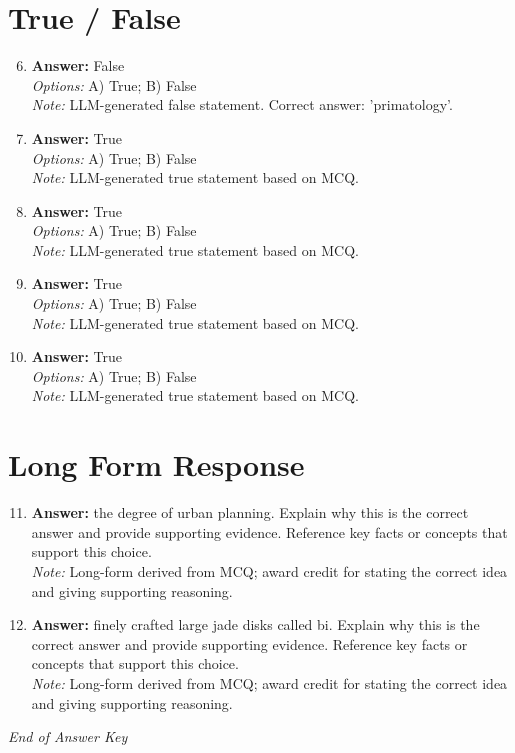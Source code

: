 \documentclass[12pt]{article}
\begin{document}
\section*{True / False}
\begin{enumerate}[label=\arabic*.]
\setcounter{enumi}{5}
\item \textbf{Answer:} False
\\ \textit{Options:} A) True; B) False
\\ \textit{Note:} LLM-generated false statement. Correct answer: 'primatology'.
\item \textbf{Answer:} True
\\ \textit{Options:} A) True; B) False
\\ \textit{Note:} LLM-generated true statement based on MCQ.
\item \textbf{Answer:} True
\\ \textit{Options:} A) True; B) False
\\ \textit{Note:} LLM-generated true statement based on MCQ.
\item \textbf{Answer:} True
\\ \textit{Options:} A) True; B) False
\\ \textit{Note:} LLM-generated true statement based on MCQ.
\item \textbf{Answer:} True
\\ \textit{Options:} A) True; B) False
\\ \textit{Note:} LLM-generated true statement based on MCQ.
\end{enumerate}

\section*{Long Form Response}
\begin{enumerate}[label=\arabic*.]
\setcounter{enumi}{10}
\item \textbf{Answer:} the degree of urban planning. Explain why this is the correct answer and provide
supporting evidence. Reference key facts or concepts that support this choice.
\\ \textit{Note:} Long-form derived from MCQ; award credit for stating the correct idea and giving supporting reasoning.
\item \textbf{Answer:} finely crafted large jade disks called bi. Explain why this is the correct answer and
provide supporting evidence. Reference key facts or concepts that support this choice.
\\ \textit{Note:} Long-form derived from MCQ; award credit for stating the correct idea and giving supporting reasoning.
\end{enumerate}

\vfill
\noindent\textit{End of Answer Key}
\end{document}
